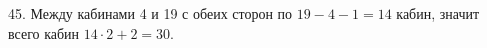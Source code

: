 45. Между кабинами 4 и 19 с обеих сторон по $19-4-1=14$ кабин, значит всего кабин $14\cdot2+2=30.$\\
